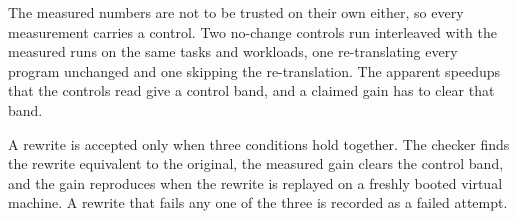 The measured numbers are not to be trusted on their own either, so every measurement carries a control.
Two no-change controls run interleaved with the measured runs on the same tasks and workloads, one re-translating every program unchanged and one skipping the re-translation.
The apparent speedups that the controls read give a control band, and a claimed gain has to clear that band.

A rewrite is accepted only when three conditions hold together.
The checker finds the rewrite equivalent to the original, the measured gain clears the control band, and the gain reproduces when the rewrite is replayed on a freshly booted virtual machine.
A rewrite that fails any one of the three is recorded as a failed attempt.
